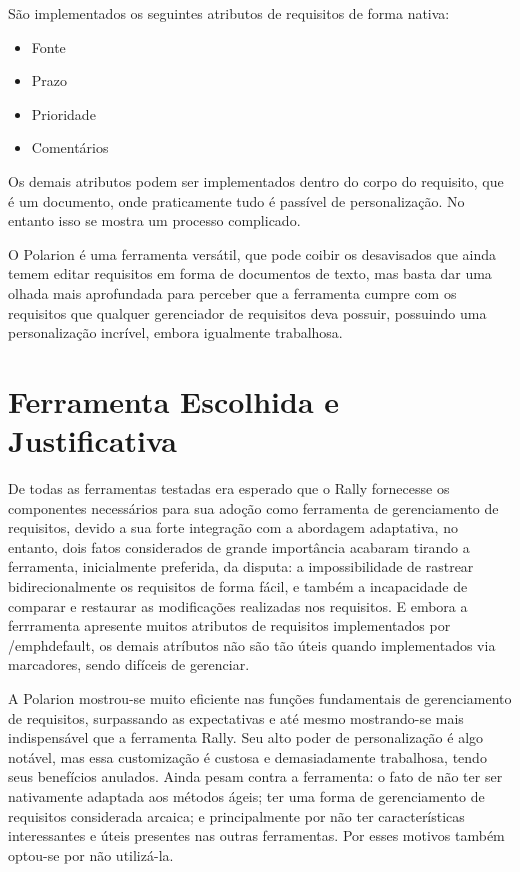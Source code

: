 São implementados os seguintes atributos de requisitos de forma nativa:

\begin{itemize}
  \item Fonte
  \item Prazo
  \item Prioridade
  \item Comentários
\end{itemize}

Os demais atributos podem ser implementados dentro do corpo do requisito, que é um documento, onde praticamente tudo é passível de personalização. No entanto isso se mostra um processo complicado.

O Polarion é uma ferramenta versátil, que pode coibir os desavisados que ainda temem editar requisitos em forma de documentos de texto, mas basta dar uma olhada mais aprofundada para perceber que a ferramenta cumpre com os requisitos que qualquer gerenciador de requisitos deva possuir, possuindo uma personalização incrível, embora igualmente trabalhosa.

\section{Ferramenta Escolhida e Justificativa}

De todas as ferramentas testadas era esperado que o Rally fornecesse os componentes necessários para sua adoção como ferramenta de gerenciamento de requisitos, devido a sua forte integração com a abordagem adaptativa, no entanto, dois fatos considerados de grande importância acabaram tirando a ferramenta, inicialmente preferida, da disputa: a impossibilidade de rastrear bidirecionalmente os requisitos de forma fácil, e também a incapacidade de comparar e restaurar as modificações realizadas nos requisitos. E embora a ferrramenta apresente muitos atributos de requisitos implementados por /emph{default}, os demais atríbutos não são tão úteis quando implementados via marcadores, sendo difíceis de gerenciar.

A Polarion mostrou-se muito eficiente nas funções fundamentais de gerenciamento de requisitos, surpassando as expectativas e até mesmo mostrando-se mais indispensável que a ferramenta Rally. Seu alto poder de personalização é algo notável, mas essa customização é custosa e demasiadamente trabalhosa, tendo seus benefícios anulados. Ainda pesam contra a ferramenta: o fato de não ter ser nativamente adaptada aos métodos ágeis; ter uma forma de gerenciamento de requisitos considerada arcaica; e principalmente por não ter características interessantes e úteis presentes nas outras ferramentas. Por esses motivos também optou-se por não utilizá-la.

